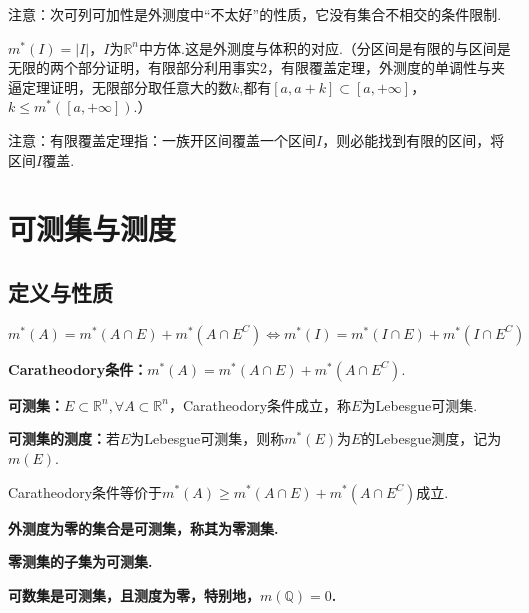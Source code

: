 \documentclass[bwprint, withoutpreface]{cumcmthesis}
\begin{document}
注意：次可列可加性是外测度中“不太好”的性质，它没有集合不相交的条件限制.

$m^*(I) = |I|$，$I$为$\mathbb{R}^n$中方体.这是外测度与体积的对应.（分区间是有限的与区间是无限的两个部分证明，有限部分利用事实2，有限覆盖定理，外测度的单调性与夹逼定理证明，无限部分取任意大的数$k$,都有$[a, a + k] \subset [a, +\infty]$，$k \leqslant m^*([a, +\infty])$.）

注意：有限覆盖定理指：一族开区间覆盖一个区间$I$，则必能找到有限的区间，将区间$I$覆盖.

\section{可测集与测度}
\subsection{定义与性质}

\indent $m^*(A) = m^*(A \cap E) + m^*(A \cap E^C) \Leftrightarrow m^*(I) = m^*(I \cap E) + m^*(I \cap E^C)$

\textbf{Caratheodory条件：}$m^*(A) = m^*(A \cap E) + m^*(A \cap E^C)$.

\begin{center}
	 \qquad
{}
\end{center}

\textbf{可测集：}$E \subset \mathbb{R}^n, \forall A \subset \mathbb{R}^n$，Caratheodory条件成立，称$E$为Lebesgue可测集.

\textbf{可测集的测度：}若$E$为Lebesgue可测集，则称$m^*(E)$为$E$的Lebesgue测度，记为$m(E)$.

Caratheodory条件等价于$m^*(A) \geqslant m^*(A \cap E) + m^*(A \cap E^C)$成立.

\textbf{外测度为零的集合是可测集，称其为零测集.}

\textbf{零测集的子集为可测集.}

\textbf{可数集是可测集，且测度为零，特别地，$m(\mathbb{Q}) =0$.}
\end{document}
